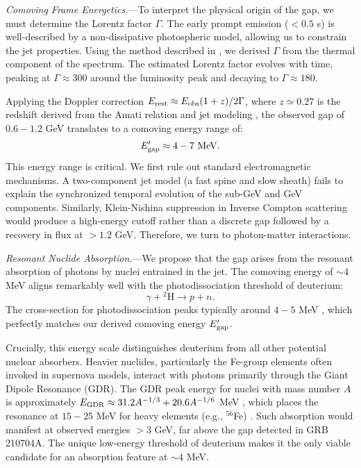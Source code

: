 \documentclass[aps,prl,twocolumn,superscriptaddress,showpacs,preprintnumbers,amsmath,amssymb,linenumbers]{revtex4-2}
\begin{document}
\textit{Comoving Frame Energetics.}---To interpret the physical origin of the gap, we must determine the Lorentz factor $\Gamma$. The early prompt emission ($<0.5$ s) is well-described by a non-dissipative photospheric model, allowing us to constrain the jet properties. Using the method described in \cite{2012MNRAS.420..468P, 2024ApJ...961..137S}, we derived $\Gamma$ from the thermal component of the spectrum. The estimated Lorentz factor evolves with time, peaking at $\Gamma \approx 300$ around the luminosity peak and decaying to $\Gamma \approx 180$.

Applying the Doppler correction $E_{\rm rest} \approx E_{\rm obs} (1+z) / 2\Gamma$, where $z \simeq 0.27$ is the redshift derived from the Amati relation and jet modeling \cite{2023MNRAS.522.5204B}, the observed gap of $0.6-1.2$ GeV translates to a comoving energy range of:
\begin{equation}
E_{\rm gap}^{\prime} \approx 4 - 7 \text{ MeV}.
\end{equation}
This energy range is critical. We first rule out standard electromagnetic mechanisms. A two-component jet model (a fast spine and slow sheath) fails to explain the synchronized temporal evolution of the sub-GeV and GeV components. Similarly, Klein-Nishina suppression in Inverse Compton scattering would produce a high-energy cutoff rather than a discrete gap followed by a recovery in flux at $>1.2$ GeV. Therefore, we turn to photon-matter interactions.

\textit{Resonant Nuclide Absorption.}---We propose that the gap arises from the resonant absorption of photons by nuclei entrained in the jet. The comoving energy of $\sim 4$ MeV aligns remarkably well with the photodissociation threshold of deuterium:
\begin{equation}
\gamma + {^2\text{H}} \rightarrow p + n.
\end{equation}
The cross-section for photodissociation peaks typically around $4-5$ MeV \cite{IAEA2000}, which perfectly matches our derived comoving energy $E_{\rm gap}^{\prime}$.

Crucially, this energy scale distinguishes deuterium from all other potential nuclear absorbers. Heavier nuclides, particularly the Fe-group elements often invoked in supernova models, interact with photons primarily through the Giant Dipole Resonance (GDR). The GDR peak energy for nuclei with mass number $A$ is approximately $E_{\rm GDR} \approx 31.2 A^{-1/3} + 20.6 A^{-1/6}$ MeV \cite{1975RvMP...47..713B}, which places the resonance at $15-25$ MeV for heavy elements (e.g., $^{56}$Fe) \cite{2020NuDS..163..109K}. Such absorption would manifest at observed energies $>3$ GeV, far above the gap detected in GRB 210704A. The unique low-energy threshold of deuterium makes it the only viable candidate for an absorption feature at $\sim 4$ MeV.
\end{document}
